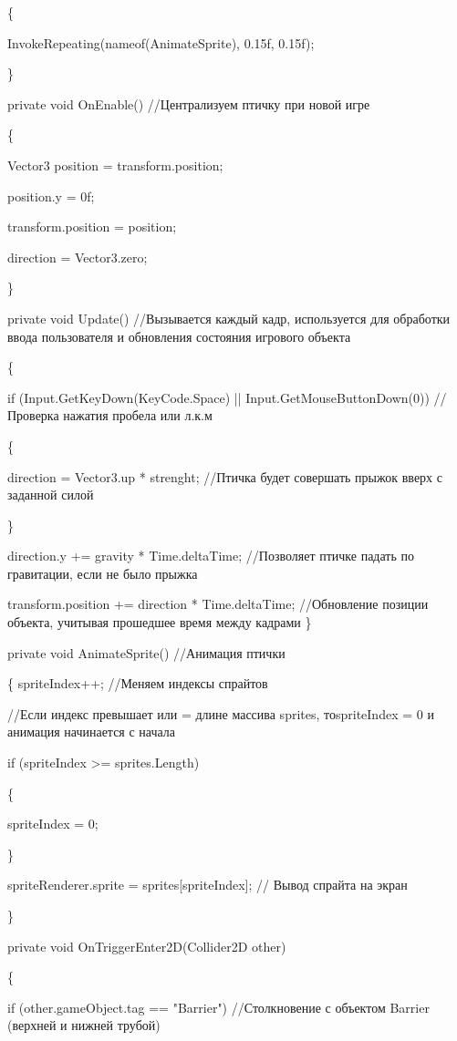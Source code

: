 \documentclass[14pt, oneside]{altsu-report}
\begin{document}
    \{

        InvokeRepeating(nameof(AnimateSprite), 0.15f, 0.15f);

    \}

    private void OnEnable() //Централизуем птичку при новой игре

    \{

        Vector3 position = transform.position;

        position.y = 0f; 

        transform.position = position;

        direction = Vector3.zero; 

    \}

    private void Update() //Вызывается каждый кадр, используется для обработки ввода пользователя и обновления состояния игрового объекта

    \{
       
        if (Input.GetKeyDown(KeyCode.Space) || Input.GetMouseButtonDown(0)) //Проверка нажатия пробела или л.к.м

        \{

            direction = Vector3.up * strenght; //Птичка будет совершать прыжок вверх с заданной силой

        \}

        direction.y += gravity * Time.deltaTime; //Позволяет птичке падать по гравитации, если не было прыжка

        transform.position += direction * Time.deltaTime; //Обновление позиции объекта, учитывая прошедшее время между кадрами
    \}
 
    private void AnimateSprite() //Анимация птички

    \{
        spriteIndex++; //Меняем индексы спрайтов
        
	//Если индекс превышает или = длине массива sprites, тоspriteIndex = 0 и анимация начинается с начала

        if (spriteIndex >= sprites.Length)

        \{

            spriteIndex = 0;

        \}

        spriteRenderer.sprite = sprites[spriteIndex]; // Вывод спрайта на экран

    \}

    private void OnTriggerEnter2D(Collider2D other)

    \{

        if (other.gameObject.tag == "Barrier") //Столкновение с объектом Barrier (верхней и нижней трубой)
\end{document}
